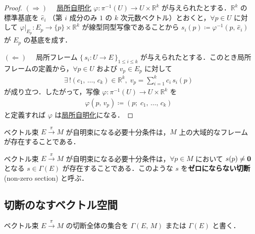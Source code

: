 \documentclass[geometry_main]{subfiles}
\begin{document}
\begin{proof}
	$\bm{(\Longrightarrow)}$ 　\hyperref[def.fiber-1]{局所自明化} $\varphi \colon \pi^{-1}(U) \to U \times \mathbb{R}^k$ が与えられたとする．$\mathbb{R}^k$ の標準基底を $\hat{e}_i$ （第 $i$ 成分のみ $1$ の $k$ 次元数ベクトル）とおくと，$\forall p \in U$ に対して $\varphi|_{E_p} \colon E_p \to \{p\} \times \mathbb{R}^k$ が線型同型写像であることから $s_i (p) \coloneqq \varphi^{-1}(p,\, \hat{e}_i)$ が $E_p$ の基底を成す．

	$\bm{(\Longleftarrow)}$ 　局所フレーム $\{\, s_i \colon U \to E\, \}_{1\le i \le k}$ が与えられたとする．このとき局所フレームの定義から，$\forall p \in U$ および $v_p \in E_p$ に対して
	\begin{align}
		\exists \,! (c_1,\, \dots ,\, c_k) \in \mathbb{R}^k,\; v_p = \sum_{i=1}^k c_i\, s_i(p)
	\end{align}
	が成り立つ．したがって，写像 $\varphi \colon \pi^{-1}(U) \to U \times \mathbb{R}^k$ を
	\begin{align}
		\varphi(p,\, v_p) \coloneqq (p;\; c_1,\, \dots ,\, c_k)
	\end{align}
	と定義すれば $\varphi$ は\hyperref[def.fiber-1]{局所自明化}になる．
\end{proof}

\begin{mycol}[]{}
	ベクトル束 $E \xrightarrow{\pi} M$ が自明束になる必要十分条件は，$M$ 上の大域的なフレームが存在することである．
\end{mycol}

\begin{mycol}[]{}
	ベクトル束 $E \xrightarrow{\pi} M$ が自明束になる必要十分条件は，$\forall p \in M$ において $s(p) \neq \vb*{0}$ となる $s \in \Gamma(E)$ が存在することである．このような $s$ を\textbf{ゼロにならない切断} (non-zero section) と呼ぶ．
\end{mycol}

\subsection{切断のなすベクトル空間}

ベクトル束 $E \xrightarrow{\pi} M$ の切断全体の集合を $\Gamma (E,\, M)$ または $\Gamma(E)$ と書く．
\end{document}
